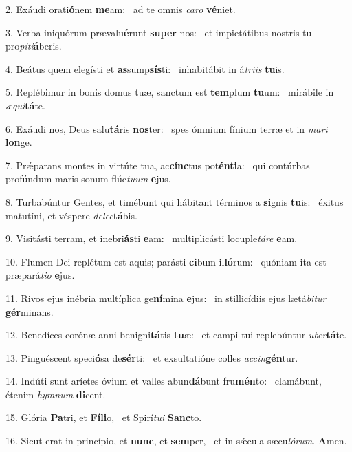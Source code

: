 2. Exáudi orati\textbf{ó}nem \textbf{me}am: \ast\  ad te omnis \textit{ca}\textit{ro} \textbf{vé}niet.\

3. Verba iniquórum prævalu\textbf{é}runt \textbf{su}\textbf{per} nos: \ast\  et impietátibus nostris tu pro\textit{pi}\textit{ti}\textbf{á}beris.\

4. Beátus quem elegísti et \textbf{as}sump\textbf{sís}ti: \ast\  inhabitábit in á\textit{tri}\textit{is} \textbf{tu}is.\

5. Replébimur in bonis domus tuæ, sanctum est \textbf{tem}plum \textbf{tu}um: \ast\  mirábile in \textit{æ}\textit{qui}\textbf{tá}te.\

6. Exáudi nos, Deus salu\textbf{tá}ris \textbf{nos}ter: \ast\  spes ómnium fínium terræ et in \textit{ma}\textit{ri} \textbf{lon}ge.\

7. Prǽparans montes in virtúte tua, ac\textbf{cínc}tus pot\textbf{én}\textbf{ti}a: \ast\  qui contúrbas profúndum maris sonum flúc\textit{tu}\textit{um} \textbf{e}jus.\

8. Turbabúntur Gentes, et timébunt qui hábitant términos a \textbf{si}gnis \textbf{tu}is: \ast\  éxitus matutíni, et véspere \textit{de}\textit{lec}\textbf{tá}bis.\

9. Visitásti terram, et inebri\textbf{ás}ti \textbf{e}am: \ast\  multiplicásti locuple\textit{tá}\textit{re} \textbf{e}am.\

10. Flumen Dei replétum est aquis; parásti \textbf{ci}bum il\textbf{ló}rum: \ast\  quóniam ita est præpará\textit{ti}\textit{o} \textbf{e}jus.\

11. Rivos ejus inébria multíplica ge\textbf{ní}mina \textbf{e}jus: \ast\  in stillicídiis ejus lætá\textit{bi}\textit{tur} \textbf{gér}minans.\

12. Benedíces corónæ anni benigni\textbf{tá}tis \textbf{tu}æ: \ast\  et campi tui replebúntur \textit{u}\textit{ber}\textbf{tá}te.\

13. Pinguéscent speci\textbf{ó}sa de\textbf{sér}ti: \ast\  et exsultatióne colles \textit{ac}\textit{cin}\textbf{gén}tur.\

14. Indúti sunt aríetes óvium et valles abun\textbf{dá}bunt fru\textbf{mén}to: \ast\  clamábunt, étenim \textit{hym}\textit{num} \textbf{di}cent.\

15. Glória \textbf{Pa}tri, et \textbf{Fí}\textbf{li}o, \ast\  et Spirí\textit{tu}\textit{i} \textbf{Sanc}to.\

16. Sicut erat in princípio, et \textbf{nunc}, et \textbf{sem}per, \ast\  et in sǽcula sæcu\textit{ló}\textit{rum}. \textbf{A}men.\

